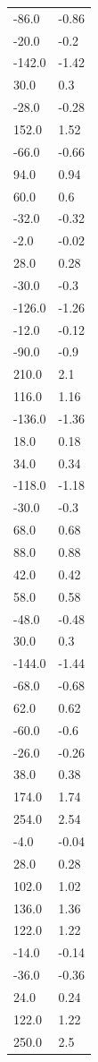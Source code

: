 \begin{longtable}{ll}
-86.0 & -0.86 \\
-20.0 & -0.2 \\
-142.0 & -1.42 \\
30.0 & 0.3 \\
-28.0 & -0.28 \\
152.0 & 1.52 \\
-66.0 & -0.66 \\
94.0 & 0.94 \\
60.0 & 0.6 \\
-32.0 & -0.32 \\
-2.0 & -0.02 \\
28.0 & 0.28 \\
-30.0 & -0.3 \\
-126.0 & -1.26 \\
-12.0 & -0.12 \\
-90.0 & -0.9 \\
210.0 & 2.1 \\
116.0 & 1.16 \\
-136.0 & -1.36 \\
18.0 & 0.18 \\
34.0 & 0.34 \\
-118.0 & -1.18 \\
-30.0 & -0.3 \\
68.0 & 0.68 \\
88.0 & 0.88 \\
42.0 & 0.42 \\
58.0 & 0.58 \\
-48.0 & -0.48 \\
30.0 & 0.3 \\
-144.0 & -1.44 \\
-68.0 & -0.68 \\
62.0 & 0.62 \\
-60.0 & -0.6 \\
-26.0 & -0.26 \\
38.0 & 0.38 \\
174.0 & 1.74 \\
254.0 & 2.54 \\
-4.0 & -0.04 \\
28.0 & 0.28 \\
102.0 & 1.02 \\
136.0 & 1.36 \\
122.0 & 1.22 \\
-14.0 & -0.14 \\
-36.0 & -0.36 \\
24.0 & 0.24 \\
122.0 & 1.22 \\
250.0 & 2.5 \\

\end{longtable}
